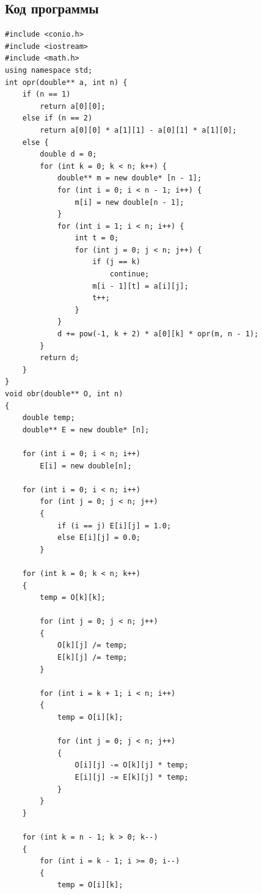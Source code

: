 \documentclass[12pt,a4paper]{scrartcl}
\begin{document}
\subsection{Код программы}
\begin{verbatim}
#include <conio.h>
#include <iostream>
#include <math.h>
using namespace std;
int opr(double** a, int n) { 
    if (n == 1)
        return a[0][0];
    else if (n == 2)
        return a[0][0] * a[1][1] - a[0][1] * a[1][0];
    else {
        double d = 0;
        for (int k = 0; k < n; k++) {
            double** m = new double* [n - 1];
            for (int i = 0; i < n - 1; i++) {
                m[i] = new double[n - 1];
            }
            for (int i = 1; i < n; i++) {
                int t = 0;
                for (int j = 0; j < n; j++) {
                    if (j == k)
                        continue;
                    m[i - 1][t] = a[i][j];
                    t++;
                }
            }
            d += pow(-1, k + 2) * a[0][k] * opr(m, n - 1);
        }
        return d;
    }
}
void obr(double** O, int n)
{
    double temp;
    double** E = new double* [n];

    for (int i = 0; i < n; i++)
        E[i] = new double[n];

    for (int i = 0; i < n; i++)
        for (int j = 0; j < n; j++)
        {
            if (i == j) E[i][j] = 1.0;
            else E[i][j] = 0.0;
        }

    for (int k = 0; k < n; k++)
    {
        temp = O[k][k];

        for (int j = 0; j < n; j++)
        {
            O[k][j] /= temp;
            E[k][j] /= temp;
        }

        for (int i = k + 1; i < n; i++)
        {
            temp = O[i][k];

            for (int j = 0; j < n; j++)
            {
                O[i][j] -= O[k][j] * temp;
                E[i][j] -= E[k][j] * temp;
            }
        }
    }

    for (int k = n - 1; k > 0; k--)
    {
        for (int i = k - 1; i >= 0; i--)
        {
            temp = O[i][k];


\end{verbatim}
\end{document}
